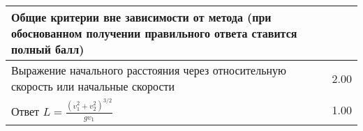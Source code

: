 {\begin{tabular}{|p{}|c|}
 \hline 
                                                                                                                                                                                                                                                                                                                                     \textbf{Общие критерии вне зависимости от метода
(при обоснованном получении правильного ответа ставится полный балл)}             &             \\ 
 \hline 
                                                                                                                                                                                                                                                                                                                                     Выражение начального расстояния через относительную скорость или начальные скорости             &                                     2.00                        \\ 
 \hline 
                                                                                                                                                                                                                                                                                                                                     Ответ $L=\frac{(v^2_1+v^2_2 )^{3/2}}{gv_1}$             &                                     1.00                        \\ 
 \hline 
                                                                                                                                                                        \end{tabular}}


